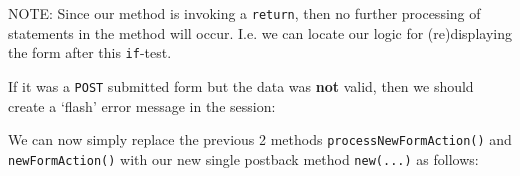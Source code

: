 \documentclass[a4paperpaper,openright]{book}
\newenvironment{Shaded}{}{}
\newcommand{\KeywordTok}[1]{\textcolor[rgb]{0.00,0.44,0.13}{\textbf{#1}}}
\newcommand{\NormalTok}[1]{#1}
\newcommand{\OtherTok}[1]{\textcolor[rgb]{0.00,0.44,0.13}{#1}}
\newcommand{\StringTok}[1]{\textcolor[rgb]{0.25,0.44,0.63}{#1}}
\begin{document}
NOTE: Since our method is invoking a \texttt{return}, then no further
processing of statements in the method will occur. I.e. we can locate
our logic for (re)displaying the form after this \texttt{if}-test.

If it was a \texttt{POST} submitted form but the data was \textbf{not}
valid, then we should create a `flash' error message in the session:

\begin{Shaded}
\end{Shaded}

We can now simply replace the previous 2 methods
\texttt{processNewFormAction()} and \texttt{newFormAction()} with our
new single postback method \texttt{new(...)} as follows:
\end{document}
